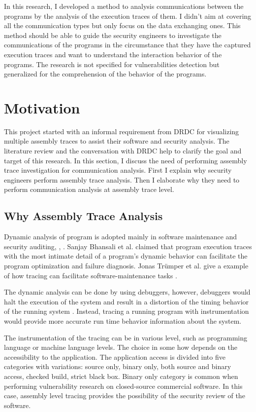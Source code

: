 In this research, I developed a method to analysis communications between the programs by the analysis of the execution traces of them. I didn't aim at covering all the communication types but only focus on the data exchanging ones. This method should be able to guide the security engineers to investigate the communications of the programs in the circumstance that they have the captured execution traces and want to understand the interaction behavior of the programs. The research is not specified for vulnerabilities detection but generalized for the comprehension of the behavior of the programs.

\section{Motivation}
This project started with an informal requirement from DRDC for visualizing multiple assembly traces to assist their software and security analysis. The literature review and the conversation with DRDC help to clarify the goal and target of this research. In this section, I discuss the need of performing assembly trace investigation for communication analysis. First I explain why security engineers perform assembly trace analysis. Then I elaborate why they need to perform communication analysis at assembly trace level. 

\subsection{Why Assembly Trace Analysis}
Dynamic analysis of program is adopted mainly in software maintenance and security auditing\cite{zhang2010detecting}, \cite{cai2016sworddta}, \cite{somorovsky2016systematic}. Sanjay Bhansali et al. claimed that program execution traces with the most intimate detail of a program's dynamic behavior can facilitate the program optimization and failure diagnosis. Jonas Tr{\"u}mper et al. give a example of how tracing can facilitate software-maintenance tasks \cite{trumper2012maintenance}.

The dynamic analysis can be done by using debuggers, however, debuggers would halt the execution of the system and result in a distortion of the timing behavior of the running system \cite{trumper2012maintenance}. Instead, tracing a running program with instrumentation would provide more accurate run time behavior information about the system.

The instrumentation of the tracing can be in various level, such as programming language or machine language levels. The choice in some how depends on the accessibility to the application. The application access is divided into five categories with variations: source only, binary only, both source and binary access, checked build, strict black box. Binary only category is common when performing vulnerability research on closed-source commercial software.\cite{dowd_art_2006} In this case, assembly level tracing provides the possibility of the security review of the software.

